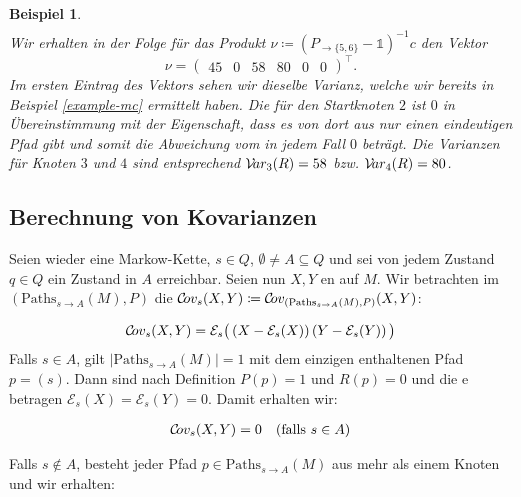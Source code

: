 \documentclass[a4paper]{article}
\newcommand{\mc}{Markow-Kette}
\newtheorem{beispiel}[satz]{Beispiel}
\theoremstyle{nonumberplain}
\begin{document}
\begin{beispiel}
\begin{align*}
	\end{align*}
	Wir erhalten in der Folge für das Produkt $\nu \coloneqq (P_{\rightarrow \{5,6\}} - \mathbb{1})^{-1}c$ den Vektor
	\begin{equation*}
	\nu = \begin{pmatrix} 45 & 0 & 58 & 80 & 0 & 0 \end{pmatrix}^\intercal\text{.}
	\end{equation*}
	Im ersten Eintrag des Vektors sehen wir dieselbe Varianz, welche wir bereits in Beispiel \ref{example-mc} ermittelt haben. Die \var{} für den Startknoten $2$ ist $0$ in Übereinstimmung mit der Eigenschaft, dass es von dort aus nur einen eindeutigen Pfad gibt und somit die Abweichung vom \expect{} in jedem Fall $0$ beträgt. Die Varianzen für Knoten $3$ und $4$ sind entsprechend $\mathcal{V}\!ar_3(R) = 58$ bzw. $\mathcal{V}\!ar_4(R) = 80$.
	
\end{beispiel}

\subsection{Berechnung von Kovarianzen}

Seien wieder \mcex{} eine \mc{}, $s \in Q$, $\emptyset \neq A \subseteq Q$ und sei von jedem Zustand $q\in Q$ ein Zustand in $A$ erreichbar. Seien nun $X, Y$ \reward{}en auf $M$. Wir betrachten im \probspacen{} $(\mathrm{Paths}_{s \rightarrow A}(M), P)$ die \cov{} $\mathcal{C}\!ov_s(X,Y) \coloneqq \mathcal{C}\!ov_{(\mathrm{Paths}_{s \rightarrow A}(M), P)}(X,Y)$:

\begin{equation}
\mathcal{C}\!ov_{s}(X,Y) = \mathcal{E}_{s}\big(\left(X - \mathcal{E}_{s} (X)\right)\left(Y - \mathcal{E}_{s} (Y)\right)\big)
\end{equation}
Falls $s \in A$, gilt $|\mathrm{Paths}_{s \rightarrow A}(M)| = 1$ mit dem einzigen enthaltenen Pfad $p = (s)$. Dann sind nach Definition $P(p) = 1$ und $R(p) = 0$ und die \expect{}e betragen $\mathcal{E}_{s}(X) = \mathcal{E}_{s}(Y) = 0$. Damit erhalten wir:

\begin{align}
\mathcal{C}\!ov_{s}(X,Y) = 0 && \text{(falls $s \in A$)}\label{cov_trivial}
\end{align}

Falls $s \notin A$, besteht jeder Pfad $p \in \mathrm{Paths}_{s \rightarrow A}(M)$ aus mehr als einem Knoten und wir erhalten:
\end{document}

